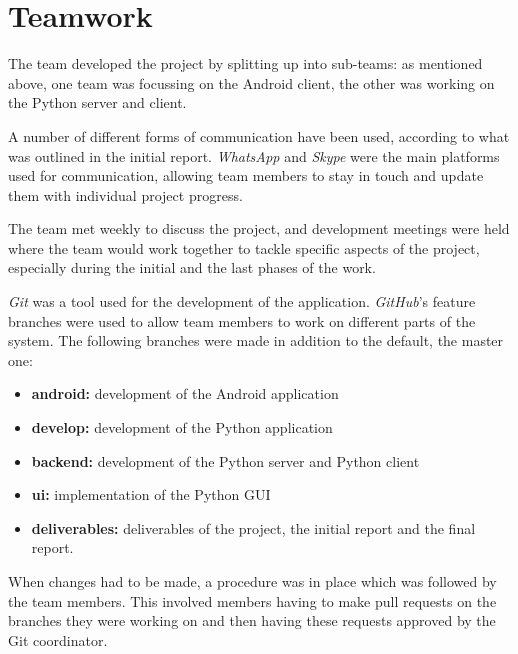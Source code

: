 \documentclass[finalReport.tex]{subfiles}
\begin{document}
\chapter{Teamwork}\label{ch:team}

The team developed the project by splitting up into sub-teams: as mentioned above, one team was focussing on the Android client, the other was working on the Python server and client. 

A number of different forms of communication have been used, according to what was outlined in the initial report. \textit{WhatsApp} and \textit{Skype} were the main platforms used for communication, allowing team members to stay in touch and update them with individual project progress. 

The team met weekly to discuss the project, and development meetings were held where the team would work together to tackle specific aspects of the project, especially during the initial and the last phases of the work.

\textit{Git} was a tool used for the development of the application. \textit{GitHub}'s feature branches were used to allow team members to work on different parts of the system. The following branches were made in addition to the default, the master one:
\begin{itemize}
\item \textbf{android:} development of the Android application
\item \textbf{develop:} development of the Python application
\item\textbf{backend:} development of the Python server and Python client
\item \textbf{ui:} implementation of the Python GUI
\item \textbf{deliverables:} deliverables of the project, the initial report and the final report.
\end{itemize}
 
When changes had to be made, a procedure was in place which was followed by the team members. This involved members having to make pull requests on the branches they were working on and then having these requests approved by the Git coordinator.
\end{document}
